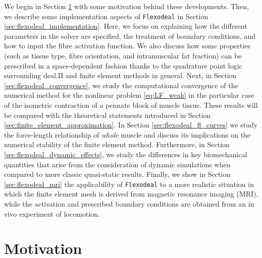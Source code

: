 \documentclass{sfuthesis}
\numberwithin{equation}{section}
\numberwithin{figure}{chapter}
\numberwithin{table}{chapter}
\theoremstyle{definition}
\begin{document}
We begin in Section \ref{sec:flexodeal_background} with some motivation behind these developments. Then, we describe some implementation aspects of \texttt{Flexodeal} in Section \ref{sec:flexodeal_implementation}. Here, we focus on explaining how the different parameters in the solver are specified, the treatment of boundary conditions, and how to input the fibre activation function. We also discuss how some properties (such as tissue type, fibre orientation, and intramuscular fat fraction) can be prescribed in a space-dependent fashion thanks to the quadrature point logic surrounding deal.II and finite element methods in general.
Next, in Section \ref{sec:flexodeal_convergence}, we study the computational convergence of the numerical method for the nonlinear problem \eqref{eq:LF_weak} in the particular case of the isometric contraction of a pennate block of muscle tissue. These results will be compared with the theoretical statements introduced in Section \ref{sec:finite_element_approximation}.
In Section \ref{sec:flexodeal_fl_curves} we study the force-length relationship of \textit{whole} muscle and discuss its implications on the numerical stability of the finite element method. 
Furthermore, in Section \ref{sec:flexodeal_dynamic_effects}, we study the differences in key biomechanical quantities that arise from the consideration of dynamic simulations when compared to more classic quasi-static results. 
Finally, we show in Section \ref{sec:flexodeal_mri} the applicability of \texttt{Flexodeal} to a more realistic situation in which the finite element mesh is derived from magnetic resonance imaging (MRI), while the activation and prescribed boundary conditions are obtained from an in vivo experiment of locomotion.

\section{Motivation} \label{sec:flexodeal_background} 

\end{document}
